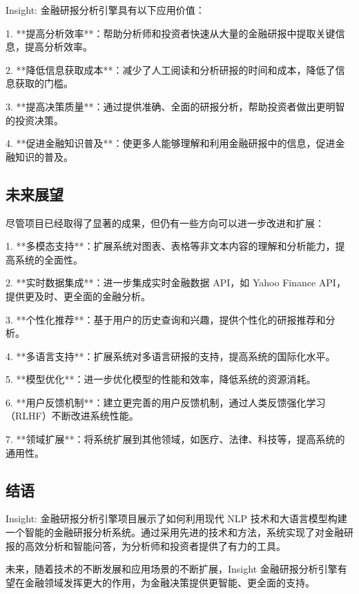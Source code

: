 Insight: 金融研报分析引擎具有以下应用价值：

1. **提高分析效率**：帮助分析师和投资者快速从大量的金融研报中提取关键信息，提高分析效率。

2. **降低信息获取成本**：减少了人工阅读和分析研报的时间和成本，降低了信息获取的门槛。

3. **提高决策质量**：通过提供准确、全面的研报分析，帮助投资者做出更明智的投资决策。

4. **促进金融知识普及**：使更多人能够理解和利用金融研报中的信息，促进金融知识的普及。

\subsection{未来展望}

尽管项目已经取得了显著的成果，但仍有一些方向可以进一步改进和扩展：

1. **多模态支持**：扩展系统对图表、表格等非文本内容的理解和分析能力，提高系统的全面性。

2. **实时数据集成**：进一步集成实时金融数据 API，如 Yahoo Finance API，提供更及时、更全面的金融分析。

3. **个性化推荐**：基于用户的历史查询和兴趣，提供个性化的研报推荐和分析。

4. **多语言支持**：扩展系统对多语言研报的支持，提高系统的国际化水平。

5. **模型优化**：进一步优化模型的性能和效率，降低系统的资源消耗。

6. **用户反馈机制**：建立更完善的用户反馈机制，通过人类反馈强化学习（RLHF）不断改进系统性能。

7. **领域扩展**：将系统扩展到其他领域，如医疗、法律、科技等，提高系统的通用性。

\subsection{结语}

Insight: 金融研报分析引擎项目展示了如何利用现代 NLP 技术和大语言模型构建一个智能的金融研报分析系统。通过采用先进的技术和方法，系统实现了对金融研报的高效分析和智能问答，为分析师和投资者提供了有力的工具。

未来，随着技术的不断发展和应用场景的不断扩展，Insight 金融研报分析引擎有望在金融领域发挥更大的作用，为金融决策提供更智能、更全面的支持。
